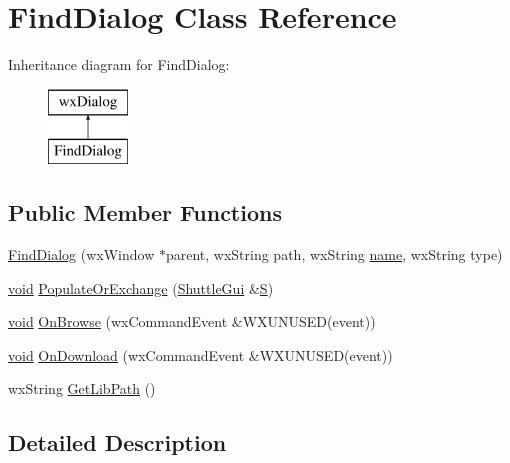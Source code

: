 \hypertarget{class_find_dialog}{}\section{Find\+Dialog Class Reference}
\label{class_find_dialog}
Inheritance diagram for Find\+Dialog\+:\begin{figure}[H]
\begin{center}
\leavevmode
\includegraphics[height=2.000000cm]{class_find_dialog}
\end{center}
\end{figure}
\subsection*{Public Member Functions}
\begin{DoxyCompactItemize}
\item 
\hyperlink{class_find_dialog_a25d649a713f0bd3aa05bf1cf97d0ac41}{Find\+Dialog} (wx\+Window $\ast$parent, wx\+String path, wx\+String \hyperlink{lib_2expat_8h_a1b49b495b59f9e73205b69ad1a2965b0}{name}, wx\+String type)
\item 
\hyperlink{sound_8c_ae35f5844602719cf66324f4de2a658b3}{void} \hyperlink{class_find_dialog_a9690a3eb243d42c490fbedf23b8affc5}{Populate\+Or\+Exchange} (\hyperlink{class_shuttle_gui}{Shuttle\+Gui} \&\hyperlink{xlftab_8c_af933676109efed7ab34cea71d748a517}{S})
\item 
\hyperlink{sound_8c_ae35f5844602719cf66324f4de2a658b3}{void} \hyperlink{class_find_dialog_a3b3c5e87aa80119bdb2e5fac31ef8c4b}{On\+Browse} (wx\+Command\+Event \&W\+X\+U\+N\+U\+S\+ED(event))
\item 
\hyperlink{sound_8c_ae35f5844602719cf66324f4de2a658b3}{void} \hyperlink{class_find_dialog_ac8651ddf3bd210f077a2070aa244f95d}{On\+Download} (wx\+Command\+Event \&W\+X\+U\+N\+U\+S\+ED(event))
\item 
wx\+String \hyperlink{class_find_dialog_a4489679e9dae145ec707a081c250cc17}{Get\+Lib\+Path} ()
\end{DoxyCompactItemize}


\subsection{Detailed Description}


